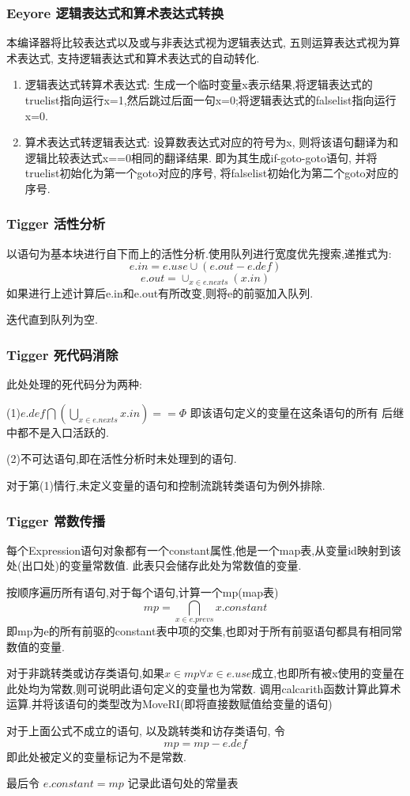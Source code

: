 \documentclass{beamer}
\begin{document}
\begin{frame}[c]\frametitle{Eeyore 逻辑表达式和算术表达式转换}
本编译器将比较表达式以及或与非表达式视为逻辑表达式, 五则运算表达式视为算术表达式, 支持逻辑表达式和算术表达式的自动转化.

\begin{enumerate}[(1)]
\item 逻辑表达式转算术表达式: 生成一个临时变量x表示结果,将逻辑表达式的truelist指向运行x=1,然后跳过后面一句x=0;将逻辑表达式的falselist指向运行x=0.
\item 算术表达式转逻辑表达式: 设算数表达式对应的符号为x, 则将该语句翻译为和逻辑比较表达式x==0相同的翻译结果. 即为其生成if-goto-goto语句, 并将truelist初始化为第一个goto对应的序号, 将falselist初始化为第二个goto对应的序号.
\end{enumerate}
\end{frame}
\begin{frame}[c]\frametitle{Tigger 活性分析}
以语句为基本块进行自下而上的活性分析.使用队列进行宽度优先搜索,递推式为:
$$e.in = e.use\cup (e.out - e.def)$$
$$e.out = \cup_{x\in e.nexts} (x.in)$$
如果进行上述计算后e.in和e.out有所改变,则将e的前驱加入队列.

迭代直到队列为空.

\end{frame}
 \begin{frame}[c]\frametitle{Tigger 死代码消除}
此处处理的死代码分为两种:

(1)$e.def \bigcap\left( \bigcup_{x\in e.nexts}x.in \right)== \Phi$ 即该语句定义的变量在这条语句的所有
后继中都不是入口活跃的.

(2)不可达语句,即在活性分析时未处理到的语句.

对于第(1)情行,未定义变量的语句和控制流跳转类语句为例外排除.
\end{frame}
\begin{frame}[c]\frametitle{Tigger 常数传播}
每个Expression语句对象都有一个constant属性,他是一个map表,从变量id映射到该处(出口处)的变量常数值. 此表只会储存此处为常数值的变量.

按顺序遍历所有语句,对于每个语句,计算一个mp(map表)
$$ mp = \bigcap_{x \in e.prevs}x.constant $$
即mp为e的所有前驱的constant表中项的交集,也即对于所有前驱语句都具有相同常数值的变量.

对于非跳转类或访存类语句,如果$ x\in mp \forall x\in e.use $成立,也即所有被x使用的变量在此处均为常数,则可说明此语句定义的变量也为常数. 调用calcarith函数计算此算术运算.并将该语句的类型改为MoveRI(即将直接数赋值给变量的语句)

对于上面公式不成立的语句, 以及跳转类和访存类语句, 令
$$ mp = mp - e.def $$
即此处被定义的变量标记为不是常数.

最后令 $  e.constant = mp $ 记录此语句处的常量表

\end{frame}
\end{document}
